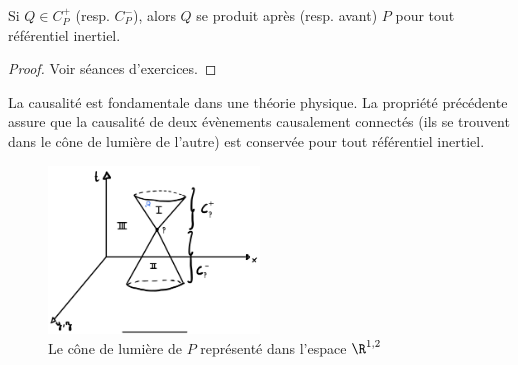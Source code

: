 {\begin{theoremframe}
    \begin{propri}
         Si $Q \in C_P^+$ (resp. $C_P^-$), alors $Q$ se produit après (resp. avant) $P$ pour tout référentiel inertiel.
    \end{propri}
\end{theoremframe}
\begin{proof}
    Voir séances d'exercices.
\end{proof}
La causalité est fondamentale dans une théorie physique. La propriété précédente assure que la causalité de deux évènements causalement connectés (ils se trouvent dans le cône de lumière de l'autre) est conservée pour tout référentiel inertiel. 
    \begin{figure}[H]
     \centering
        \includegraphics[width=0.5\textwidth]{Chapitres/2. Relativité Restreinte/Images/Cone de lumière avec point Q dans 1.jpg}
        \caption{Le cône de lumière de $P$ représenté dans l'espace $\R^{1,2}$}
        \label{fig:2.1}
\end{figure}

}
